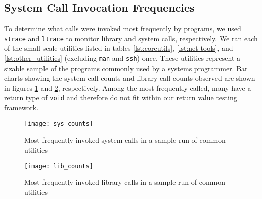 \subsection{System Call Invocation Frequencies}
To determine what calls were invoked most frequently by programs, we used \texttt{strace} and \texttt{ltrace} to monitor library and system calls, respectively. We ran each of the small-scale utilities listed in tables \ref{lst:coreutils}, \ref{lst:net-tools}, and \ref{lst:other_utilities} (excluding \texttt{man} and \texttt{ssh}) once. These utilities represent a sizable sample of the programs commonly used by a systems programmer. Bar charts showing the system call counts and library call counts observed are shown in figures \ref{fig:sys_counts} and \ref{fig:lib_counts}, respectively. Among the most frequently called, many have a return type of \texttt{void} and therefore do not fit within our return value testing framework.\\
\begin{figure}
\centering
\texttt{[image: sys\_counts]}
\caption{Most frequently invoked system calls in a sample run of common utilities}
\label{fig:sys_counts}
\end{figure}

\begin{figure}
\centering
\texttt{[image: lib\_counts]}
\caption{Most frequently invoked library calls in a sample run of common utilities}
\label{fig:lib_counts}
\end{figure}
